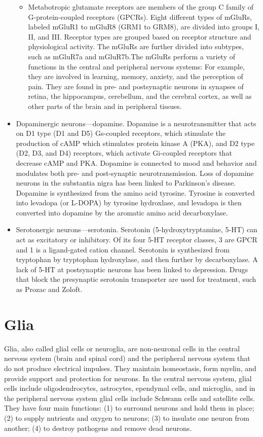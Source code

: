 \begin{itemize}
\begin{itemize}
  \item
    Metabotropic glutamate receptors are members of the group C family of G-protein-coupled receptors (GPCRs).
    Eight different types of mGluRs, labeled mGluR1 to mGluR8 (GRM1 to GRM8), are divided into groups I, II, and III. Receptor types are grouped based on receptor structure and physiological activity. The mGluRs are further divided into subtypes, such as mGluR7a and mGluR7b.The mGluRs perform a variety of functions in the central and peripheral nervous systems: For example, they are involved in learning, memory, anxiety, and the perception of pain. They are found in pre- and postsynaptic neurons in synapses of retina, the hippocampus, cerebellum, and the cerebral cortex, as well as other parts of the brain and in peripheral tissues.
  \end{itemize}
\item
  Dopaminergic neurons---dopamine. Dopamine is a neurotransmitter that acts on D1 type (D1 and D5) Gs-coupled receptors, which stimulate the production of cAMP which stimulates protein kinase A (PKA), and D2 type (D2, D3, and D4) receptors, which activate Gi-coupled receptors that decrease cAMP and PKA. Dopamine is connected to mood and behavior and modulates both pre- and post-synaptic neurotransmission. Loss of dopamine neurons in the substantia nigra has been linked to Parkinson's disease. Dopamine is synthesized from the amino acid tyrosine. Tyrosine is converted into levadopa (or L-DOPA) by tyrosine hydroxlase, and levadopa is then converted into dopamine by the aromatic amino acid decarboxylase.
\item
  Serotonergic neurons---serotonin. Serotonin (5-hydroxytryptamine, 5-HT) can act as excitatory or inhibitory. Of its four 5-HT receptor classes, 3 are GPCR and 1 is a ligand-gated cation channel. Serotonin is synthesized from tryptophan by tryptophan hydroxylase, and then further by decarboxylase. A lack of 5-HT at postsynaptic neurons has been linked to depression. Drugs that block the presynaptic serotonin transporter are used for treatment, such as Prozac and Zoloft.
\end{itemize}

\hypertarget{glia}{%
\section{Glia}\label{glia}}

Glia, also called glial cells or neuroglia, are non-neuronal cells in the central nervous system (brain and spinal cord) and the peripheral nervous system that do not produce electrical impulses. They maintain homeostasis, form myelin, and provide support and protection for neurons. In the central nervous system, glial cells include oligodendrocytes, astrocytes, ependymal cells, and microglia, and in the peripheral nervous system glial cells include Schwann cells and satellite cells. They have four main functions: (1) to surround neurons and hold them in place; (2) to supply nutrients and oxygen to neurons; (3) to insulate one neuron from another; (4) to destroy pathogens and remove dead neurons.

